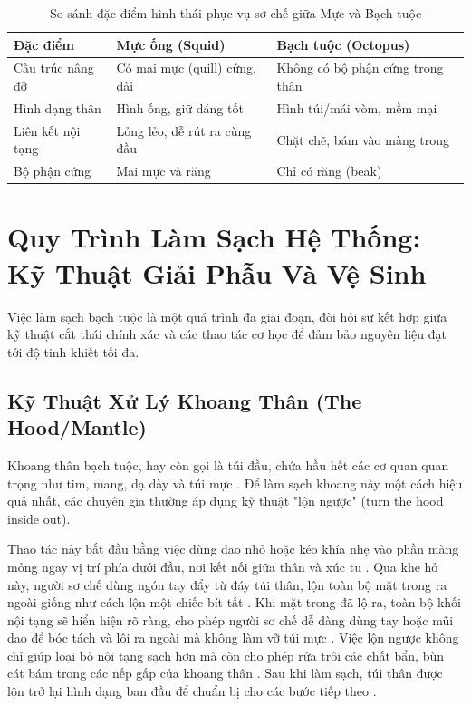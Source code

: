 \documentclass[12pt,a4paper]{report}
\begin{document}
\begin{table}[H]
\centering
\caption{So sánh đặc điểm hình thái phục vụ sơ chế giữa Mực và Bạch tuộc}
\begin{tabular}{p{3.5cm} p{5.5cm} p{5.5cm}}
\toprule
\textbf{Đặc điểm} & \textbf{Mực ống (Squid)} & \textbf{Bạch tuộc (Octopus)} \\
\midrule
Cấu trúc nâng đỡ & Có mai mực (quill) cứng, dài \cite{ref5} & Không có bộ phận cứng trong thân \cite{ref7} \\
Hình dạng thân & Hình ống, giữ dáng tốt \cite{ref5} & Hình túi/mái vòm, mềm mại \cite{ref7} \\
Liên kết nội tạng & Lỏng lẻo, dễ rút ra cùng đầu \cite{ref1} & Chặt chẽ, bám vào màng trong \cite{ref12} \\
Bộ phận cứng & Mai mực và răng \cite{ref7} & Chỉ có răng (beak) \cite{ref7} \\
\bottomrule
\end{tabular}
\end{table}

\section{Quy Trình Làm Sạch Hệ Thống: Kỹ Thuật Giải Phẫu Và Vệ Sinh}

Việc làm sạch bạch tuộc là một quá trình đa giai đoạn, đòi hỏi sự kết hợp giữa kỹ thuật cắt thái chính xác và các thao tác cơ học để đảm bảo nguyên liệu đạt tới độ tinh khiết tối đa.

\subsection{Kỹ Thuật Xử Lý Khoang Thân (The Hood/Mantle)}

Khoang thân bạch tuộc, hay còn gọi là túi đầu, chứa hầu hết các cơ quan quan trọng như tim, mang, dạ dày và túi mực \cite{ref13}. Để làm sạch khoang này một cách hiệu quả nhất, các chuyên gia thường áp dụng kỹ thuật "lộn ngược" (turn the hood inside out).

Thao tác này bắt đầu bằng việc dùng dao nhỏ hoặc kéo khía nhẹ vào phần màng mỏng ngay vị trí phía dưới đầu, nơi kết nối giữa thân và xúc tu \cite{ref2}. Qua khe hở này, người sơ chế dùng ngón tay đẩy từ đáy túi thân, lộn toàn bộ mặt trong ra ngoài giống như cách lộn một chiếc bít tất \cite{ref2}. Khi mặt trong đã lộ ra, toàn bộ khối nội tạng sẽ hiển hiện rõ ràng, cho phép người sơ chế dễ dàng dùng tay hoặc mũi dao để bóc tách và lôi ra ngoài mà không làm vỡ túi mực \cite{ref1}. Việc lộn ngược không chỉ giúp loại bỏ nội tạng sạch hơn mà còn cho phép rửa trôi các chất bẩn, bùn cát bám trong các nếp gấp của khoang thân \cite{ref12}. Sau khi làm sạch, túi thân được lộn trở lại hình dạng ban đầu để chuẩn bị cho các bước tiếp theo \cite{ref17}.
\end{document}
